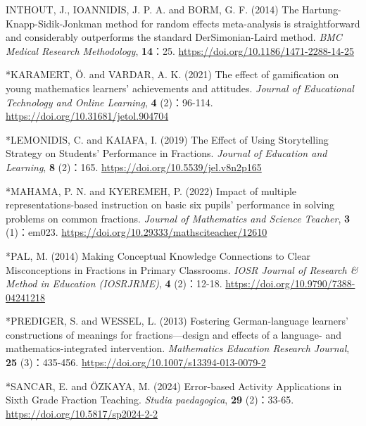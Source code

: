 \documentclass[
  lualatex, ja=standard, paper={182mm,257mm}, twocolumn, fontsize=8.5pt, baselineskip=13.5pt,
  line_length=24zw, column_gap=6.1mm, number_of_lines=45, head_space=24.5mm, gutter=16.25mm
]{jlreq}
\begin{document}
{\par\noindent{}\zw{} INTHOUT, J., IOANNIDIS, J. P. A. and BORM, G. F. (2014) The Hartung-Knapp-Sidik-Jonkman method for random effects meta-analysis is straightforward and considerably outperforms the standard DerSimonian-Laird method. \textit{BMC Medical Research Methodology}, \textbf{14}：25. \url{https://doi.org/10.1186/1471-2288-14-25}\par
\par\noindent{}\zw{} *KARAMERT, Ö. and VARDAR, A. K. (2021) The effect of gamification on young mathematics learners’ achievements and attitudes. \textit{Journal of Educational Technology and Online Learning}, \textbf{4} (2)：96-114. \url{https://doi.org/10.31681/jetol.904704}\par
\par\noindent{}\zw{} *LEMONIDIS, C. and KAIAFA, I. (2019) The Effect of Using Storytelling Strategy on Students’ Performance in Fractions. \textit{Journal of Education and Learning}, \textbf{8} (2)：165. \url{https://doi.org/10.5539/jel.v8n2p165}\par
\par\noindent{}\zw{} *MAHAMA, P. N. and KYEREMEH, P. (2022) Impact of multiple representations-based instruction on basic six pupils’ performance in solving problems on common fractions. \textit{Journal of Mathematics and Science Teacher}, \textbf{3} (1)：em023. \url{https://doi.org/10.29333/mathsciteacher/12610}\par
\par\noindent{}\zw{} *PAL, M. (2014) Making Conceptual Knowledge Connections to Clear Misconceptions in Fractions in Primary Classrooms. \textit{IOSR Journal of Research \& Method in Education (IOSRJRME)}, \textbf{4} (2)：12-18. \url{https://doi.org/10.9790/7388-04241218}\par
\par\noindent{}\zw{} *PREDIGER, S. and WESSEL, L. (2013) Fostering German-language learners’ constructions of meanings for fractions—design and effects of a language- and mathematics-integrated intervention. \textit{Mathematics Education Research Journal}, \textbf{25} (3)：435-456. \url{https://doi.org/10.1007/s13394-013-0079-2}\par
\par\noindent{}\zw{} *SANCAR, E. and ÖZKAYA, M. (2024) Error-based Activity Applications in Sixth Grade Fraction Teaching. \textit{Studia paedagogica}, \textbf{29} (2)：33-65. \url{https://doi.org/10.5817/sp2024-2-2}\par
}
\end{document}
